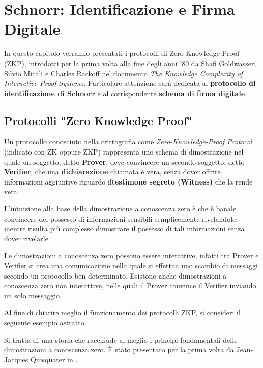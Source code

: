 \chapter{Schnorr: Identificazione e Firma Digitale}

In questo capitolo verranno presentati i protocolli di Zero-Knowledge Proof (ZKP), introdotti per la prima volta alla fine degli anni '80 da Shafi Goldwasser, Silvio Micali e Charles Rackoff nel documento \textit{The Knowledge Complexity of Interactive Proof-Systems}\cite{doi:10.1137/0218012}. Particolare attenzione sarà dedicata al \textbf{protocollo di identificazione di Schnorr} e al corrispondente \textbf{schema di firma digitale}.

\section{Protocolli "Zero Knowledge Proof"}\label{sec:zkp}

\begin{de} 
	Un protocollo conosciuto nella crittografia come \textit{Zero-Knowledge-Proof Protocol} (indicato con ZK oppure ZKP) rappresenta uno schema di dimostrazione nel quale un soggetto, detto \textbf{Prover}, deve convincere un secondo soggetto, detto \textbf{Verifier}, che una \textbf{dichiarazione} chiamata è vera, senza dover offrire informazioni aggiuntive riguardo il\textbf{testimone segreto (Witness)} che la rende vera.
\end{de}

L'intuizione alla base della dimostrazione a conoscenza zero è che è banale convincere del possesso di informazioni sensibili semplicemente rivelandole, mentre risulta più complesso  dimostrare il possesso di tali informazioni senza dover rivelarle.

Le dimostrazioni a conoscenza zero possono essere interattive, infatti tra Prover e Verifier si crea una comunicazione nella quale si effettua uno scambio di messaggi secondo un protocollo ben determinato. Esistono anche dimostrazioni a conoscenza zero non interattive, nelle quali il Prover convince il Verifier inviando un solo messaggio.

Al fine di chiarire meglio il funzionamento dei protocolli ZKP, si consideri il seguente esempio astratto.

Si tratta di una storia che racchiude al meglio i principi fondamentali delle dimostrazioni a conoscenza zero. È stato presentato per la prima volta da Jean-Jacques Quisquater in \cite{10.1007/0-387-34805-0_60}.

